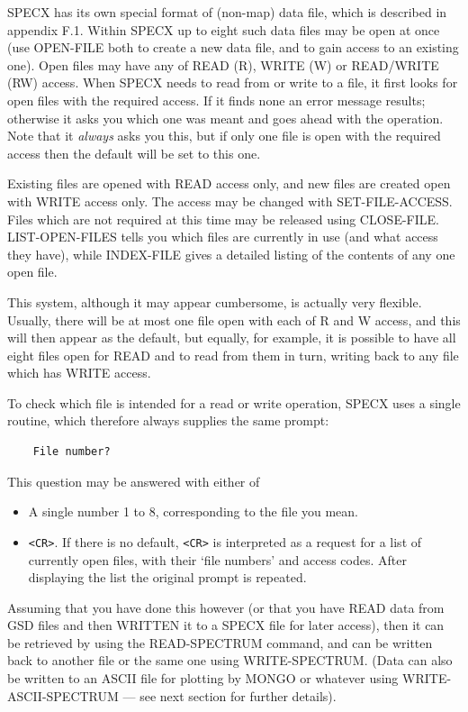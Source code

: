 \documentclass[11pt,twoside]{report}
\begin{document}
SPECX has its own special format of (non-map) data file, which is described
in appendix F.1. Within SPECX up to eight such data files may
be open at once (use OPEN-FILE both to create a new data file, and to gain
access to an existing one).
Open files may have any of READ (R), WRITE (W) or READ/WRITE
(RW) access. When SPECX needs to read from or write
to a file, it first looks
for open files with the required access. If it finds none
an error message results; otherwise it asks
you which one was meant and goes ahead with the operation. Note that it
{\em always} asks you this, but if only one file is open with the required
access then the default will be set to this one.

Existing files are
opened with READ access only, and new files are created open with WRITE access
only. The access may be changed with SET-FILE-ACCESS. Files which are not
required at this time may be released using CLOSE-FILE. LIST-OPEN-FILES
tells you which files are currently in use (and what access they have),
while INDEX-FILE gives a detailed listing of the contents of any one open
file.

This system, although it may appear cumbersome, is actually very flexible.
Usually, there will be at most one file open with each of R and W access, and
this will then appear as the default, but equally, for example, it
is possible to have all eight files open for READ and to read from them in turn,
writing back to any file which has WRITE access.

To check which file is intended for a read or write operation, SPECX uses a
single routine, which therefore always supplies the same prompt:
\begin{verbatim}
    File number?
\end{verbatim}
This question may be answered with either of
\begin{itemize}
\item A single number 1 to 8, corresponding to the file you mean.
\item \verb+<CR>+. If there is no default, \verb+<CR>+ is interpreted as
a request for a list of currently open files, with their `file numbers' and
access codes. After displaying the list the original prompt is repeated.
\end{itemize}

Assuming that you have done this however (or that you have READ data from GSD
files and then WRITTEN it to a SPECX file for later access), then it can be
retrieved by using the READ-SPECTRUM command, and can be written back to another
file or the same one using WRITE-SPECTRUM. (Data can also be written to an
ASCII file for plotting by MONGO or whatever using
WRITE-ASCII-SPECTRUM --- see next section for further details).
\end{document}
